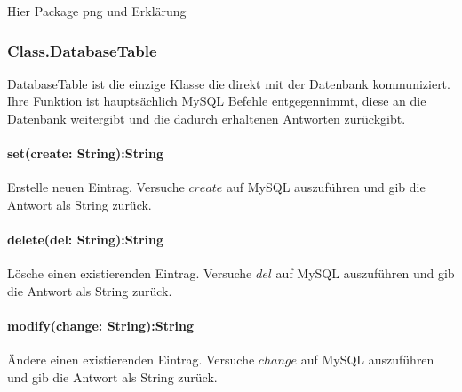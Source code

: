 Hier Package png und Erklärung

\subsubsection{Class.DatabaseTable}
DatabaseTable ist die einzige Klasse die direkt mit der Datenbank kommuniziert. Ihre Funktion ist hauptsächlich MySQL Befehle entgegennimmt, diese an die Datenbank weitergibt und die dadurch erhaltenen Antworten zurückgibt.

\paragraph{set(create: String):String} Erstelle neuen Eintrag. Versuche $create$ auf MySQL auszuführen und gib die Antwort als String zurück.

\paragraph{delete(del: String):String} Lösche einen existierenden Eintrag. Versuche $del$ auf MySQL auszuführen und gib die Antwort als String zurück.

\paragraph{modify(change: String):String} Ändere einen existierenden Eintrag. Versuche $change$ auf MySQL auszuführen und gib die Antwort als String zurück.


























\newpage